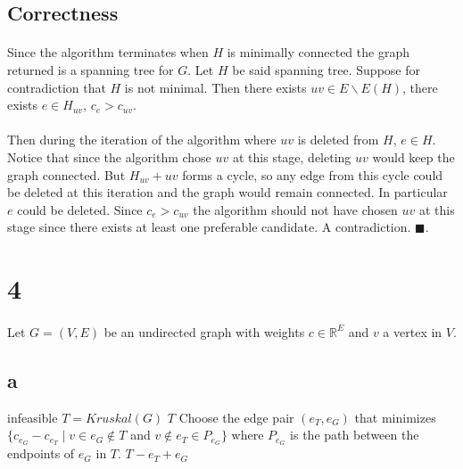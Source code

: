 \documentclass[letterpaper,12pt,oneside,onecolumn]{report}
\begin{document}
\subsection*{Correctness}
\paragraph{}
Since the algorithm terminates when $H$ is minimally connected the graph returned is a spanning tree for $G$. Let $H$ be said spanning tree. Suppose for contradiction that $H$ is not minimal. Then there exists $uv \in E \backslash E(H)$, there exists $e \in H_{uv}$, $c_{e} > c_{uv}$.
\paragraph{}
Then during the iteration of the algorithm where $uv$ is deleted from $H$, $e \in H$. Notice that since the algorithm chose $uv$ at this stage, deleting $uv$ would keep the graph connected. But $H_{uv} + uv$ forms a cycle, so any edge from this cycle could be deleted at this iteration and the graph would remain connected. In particular $e$ could be deleted. Since $c_e > c_{uv}$ the algorithm should not have chosen $uv$ at this stage since there exists at least one preferable candidate. A contradiction. $\blacksquare$.
\section*{4}
\paragraph{}
Let $G=(V,E)$ be an undirected graph with weights $c \in \mathbb{R}^E$ and $v$ a vertex in $V$.
\subsection*{a}
\begin{algorithm}
\begin{algorithmic}[1]
\Procedure{}{}
\State \Return infeasible
\EndIf
\State $T = Kruskal(G)$
\State \Return $T$
\Else
\State Choose the edge pair $(e_{T}, e_{G})$ that minimizes $\{c_{e_{G}} - c_{e_{T}} \mid v \in e_G \not\in T$ and $v \not\in e_T \in P_{e_G} \}$ where $P_{e_G}$ is the path between the endpoints of $e_G$ in $T$.
\State \Return $T - e_T + e_G$
\EndIf
\EndProcedure
\end{algorithmic}
\end{algorithm}
\end{document}
